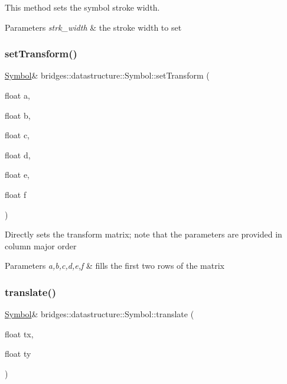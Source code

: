 This method sets the symbol stroke width. 


\begin{DoxyParams}{Parameters}
{\em strk\+\_\+width} & the stroke width to set \\
\hline
\end{DoxyParams}
\mbox{\label{classbridges_1_1datastructure_1_1_symbol_a0afcc5b50d056e40900ef9bac6c2c3d0}} 
\subsubsection{\texorpdfstring{set\+Transform()}{setTransform()}}
{\footnotesize\ttfamily \hyperlink{classbridges_1_1datastructure_1_1_symbol}{Symbol}\& bridges\+::datastructure\+::\+Symbol\+::set\+Transform (\begin{DoxyParamCaption}\item[{float}]{a,  }\item[{float}]{b,  }\item[{float}]{c,  }\item[{float}]{d,  }\item[{float}]{e,  }\item[{float}]{f }\end{DoxyParamCaption})\hspace{0.3cm}{\ttfamily [inline]}}

Directly sets the transform matrix; note that the parameters are provided in column major order


\begin{DoxyParams}{Parameters}
{\em a,b,c,d,e,f} & fills the first two rows of the matrix \\
\hline
\end{DoxyParams}
\mbox{\label{classbridges_1_1datastructure_1_1_symbol_a2b62e07a6d9c1015e212f4dc0cea1858}} 
\subsubsection{\texorpdfstring{translate()}{translate()}}
{\footnotesize\ttfamily \hyperlink{classbridges_1_1datastructure_1_1_symbol}{Symbol}\& bridges\+::datastructure\+::\+Symbol\+::translate (\begin{DoxyParamCaption}\item[{float}]{tx,  }\item[{float}]{ty }\end{DoxyParamCaption})\hspace{0.3cm}{\ttfamily [inline]}}



